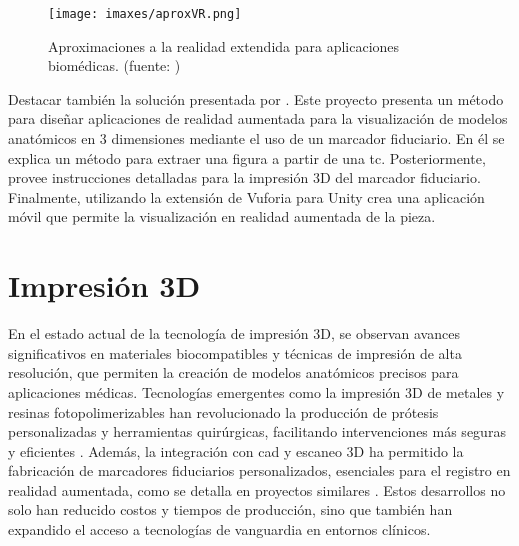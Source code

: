 \begin{figure}
	\centering
	\texttt{[image: imaxes/aproxVR.png]}
	\caption{Aproximaciones a la realidad extendida para aplicaciones biomédicas. (fuente: \cite{Venkatesan2021})}
	\label{fig:vrAproximations}
\end{figure}

Destacar también la solución presentada por \cite{MoretaMartinez2020}. Este proyecto presenta un método para diseñar aplicaciones de realidad aumentada para la visualización de modelos anatómicos en 3 dimensiones mediante el uso de un marcador fiduciario. En él se explica un método para extraer una figura a partir de una \acrshort{tc}. Posteriormente, provee instrucciones detalladas para la impresión 3D del marcador fiduciario. Finalmente, utilizando la extensión de Vuforia para Unity crea una aplicación móvil que permite la visualización en realidad aumentada de la pieza.

\section{Impresión 3D}
En el estado actual de la tecnología de impresión 3D, se observan avances significativos en materiales biocompatibles y técnicas de impresión de alta resolución, que permiten la creación de modelos anatómicos precisos para aplicaciones médicas. Tecnologías emergentes como la impresión 3D de metales y resinas fotopolimerizables han revolucionado la producción de prótesis personalizadas y herramientas quirúrgicas, facilitando intervenciones más seguras y eficientes \cite{Gonzalez_Alvarez_2021}. Además, la integración con \acrfull{cad} y escaneo 3D ha permitido la fabricación de marcadores fiduciarios personalizados, esenciales para el registro en realidad aumentada, como se detalla en proyectos similares \cite{MoretaMartinez2020}. Estos desarrollos no solo han reducido costos y tiempos de producción, sino que también han expandido el acceso a tecnologías de vanguardia en entornos clínicos.
